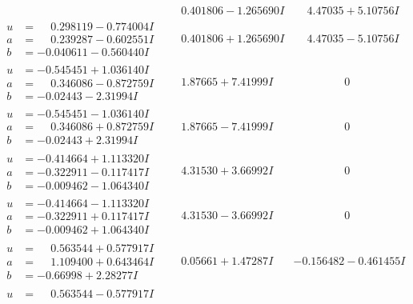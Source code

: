 \documentclass[1p]{elsarticle_modified}
\theoremstyle{definition}
\begin{document}
$$\begin{array}{c|c|c}
 & \phantom{-}0.401806 - 1.265690 I & \phantom{-}4.47035 + 5.10756 I \\ \hline\begin{aligned}
u &= \phantom{-}0.298119 - 0.774004 I \\
a &= \phantom{-}0.239287 - 0.602551 I \\
b &= -0.040611 - 0.560440 I\end{aligned}
 & \phantom{-}0.401806 + 1.265690 I & \phantom{-}4.47035 - 5.10756 I \\ \hline\begin{aligned}
u &= -0.545451 + 1.036140 I \\
a &= \phantom{-}0.346086 - 0.872759 I \\
b &= -0.02443 - 2.31994 I\end{aligned}
 & \phantom{-}1.87665 + 7.41999 I & \phantom{-0.000000 } 0 \\ \hline\begin{aligned}
u &= -0.545451 - 1.036140 I \\
a &= \phantom{-}0.346086 + 0.872759 I \\
b &= -0.02443 + 2.31994 I\end{aligned}
 & \phantom{-}1.87665 - 7.41999 I & \phantom{-0.000000 } 0 \\ \hline\begin{aligned}
u &= -0.414664 + 1.113320 I \\
a &= -0.322911 - 0.117417 I \\
b &= -0.009462 - 1.064340 I\end{aligned}
 & \phantom{-}4.31530 + 3.66992 I & \phantom{-0.000000 } 0 \\ \hline\begin{aligned}
u &= -0.414664 - 1.113320 I \\
a &= -0.322911 + 0.117417 I \\
b &= -0.009462 + 1.064340 I\end{aligned}
 & \phantom{-}4.31530 - 3.66992 I & \phantom{-0.000000 } 0 \\ \hline\begin{aligned}
u &= \phantom{-}0.563544 + 0.577917 I \\
a &= \phantom{-}1.109400 + 0.643464 I \\
b &= -0.66998 + 2.28277 I\end{aligned}
 & \phantom{-}0.05661 + 1.47287 I & -0.156482 - 0.461455 I \\ \hline\begin{aligned}
u &= \phantom{-}0.563544 - 0.577917 I \\

\end{aligned}
\end{array}$$
\end{document}
